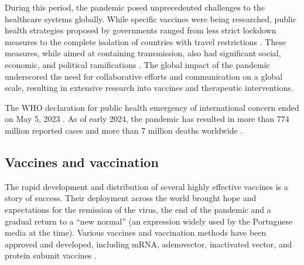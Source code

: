 During this period, the \covid pandemic posed unprecedented challenges to the healthcare systems globally.
While specific vaccines were being researched, public health strategies proposed by governments ranged from less strict lockdown measures to the complete isolation of countries with travel restrictions \citep{wilder-smith2020PublicHealth}.
These measures, while aimed at containing transmission, also had significant social, economic, and political ramifications \citep{chu2020SocialConsequences}.
The global impact of the pandemic underscored the need for collaborative efforts and communication on a global scale, resulting in extensive research into vaccines and therapeutic interventions.

The WHO declaration for public health emergency of international concern ended on May 5, 2023 \citep{worldhealthorganization2023StatementFifteenth}.
As of early 2024, the pandemic has resulted in more than 774 million reported cases and more than 7 million deaths worldwide \citep{worldhealthorganization2023WHOCoronavirus}.



\subsection{Vaccines and vaccination}

The rapid development and distribution of several highly effective \sars vaccines is a story of success.
Their deployment across the world brought hope and expectations for the remission of the virus, the end of the pandemic and a gradual return to a ``new normal'' (an expression widely used by the Portuguese media at the time).
Various vaccines and vaccination methods have been approved and developed, including mRNA, adenovector, inactivated vector, and protein subunit vaccines \citep{ao2023StrategiesDevelopment}.

